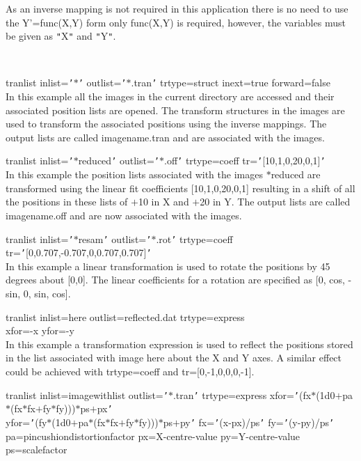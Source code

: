\documentclass[twoside,11pt]{article}
\renewcommand{\_}{\texttt{\symbol{95}}}
\newcommand{\qt}[1]{{\tt "}#1{\tt "}}
\newcommand{\qs}[1]{{\tt '}#1{\tt '}}
\newcommand{\sstexamples}[1]{
   \item[Examples:] \mbox{} \\
   \vspace{-3.5ex}
   \begin{description}
      #1
   \end{description}
}
\newcommand{\sstexamplesubsection}[2]{\sloppy \item{\ssttt #1} \mbox{} \\ #2 }
\newcommand{\sstexamples}[1]{
      \item[Examples:] \\
      \begin{description}
         #1
      \end{description}
      \\
   }
\newcommand{\sstexamplesubsection}[2]{\item[{\ssttt #1}] #2}
\begin{document}
{{{         As an inverse mapping is not required in this application
         there is no need to use the Y'=func(X,Y) form only func(X,Y)
         is required, however, the variables must be given as
         \qt{X} and \qt{Y}.
      }
   }
   \sstexamples{
      \sstexamplesubsection{
         tranlist inlist=\qs{$*$} outlist=\qs{$*$.tran} trtype=struct
                  inext=true forward=false
      }{
         In this example all the images in the current directory are
         accessed and their associated position lists are opened.
         The transform structures in the images are used to transform the
         associated positions using the inverse mappings. The output
         lists are called image\_name.tran and are associated with the
         images.
      }
      \sstexamplesubsection{
         tranlist inlist=\qs{$*$\_reduced} outlist=\qs{$*$.off} trtype=coeff
               tr=\qs{[10,1,0,20,0,1]}
      }{
         In this example the position lists associated with the images
         $*$\_reduced are transformed using the linear fit coefficients
         [10,1,0,20,0,1] resulting in a shift of all the positions in
         these lists of $+$10 in X and $+$20 in Y. The output lists are
         called image\_name.off and are now associated with the images.
      }
      \sstexamplesubsection{
         tranlist inlist=\qs{$*$\_resam} outlist=\qs{$*$.rot} trtype=coeff
               tr=\qs{[0,0.707,-0.707,0,0.707,0.707]}
      }{
         In this example a linear transformation is used to rotate the
         positions by 45 degrees about [0,0]. The linear coefficients
         for a rotation are specified as [0, cos, -sin, 0, sin, cos].
      }
      \sstexamplesubsection{
         tranlist inlist=here outlist=reflected.dat trtype=express \\
               xfor=-x yfor=-y
      }{
         In this example a transformation expression is used to reflect
         the positions stored in the list associated with image here
         about the X and Y axes. A similar effect could be achieved
         with trtype=coeff and tr=[0,-1,0,0,0,-1].
      }
      \sstexamplesubsection{
         tranlist inlist=image\_with\_list outlist=\qs{$*$.tran} trtype=express
             xfor=\qs{(fx$*$(1d0$+$pa$*$(fx$*$fx$+$fy$*$fy)))$*$ps$+$px} \\
             yfor=\qs{(fy$*$(1d0$+$pa$*$(fx$*$fx$+$fy$*$fy)))$*$ps$+$py}
             fx=\qs{(x-px)/ps} fy=\qs{(y-py)/ps}
             pa=pincushion\_distortion\_factor px=X-centre-value
             py=Y-centre-value ps=scale\_factor
      }{
}}}
\end{document}
